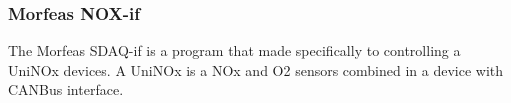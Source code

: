 \subsubsection{Morfeas NOX-if}
The Morfeas SDAQ-if is a program that made specifically to controlling a UniNOx devices.
A UniNOx is a NOx and O2 sensors combined in a device with CANBus interface.
